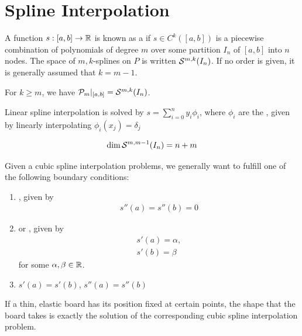 \section{Spline Interpolation}
\begin{importantdefinition}{}{}
	A function $s : [a,b] \to \mathbb{R}$ is known as a  if $s \in C^k([a,b])$ is a piecewise combination of polynomials of degree $m$ over some partition $I_n$ of $[a,b]$ into $n$ nodes. The space of $m,k$-splines on $P$ is written $\mathcal{S}^{m,k}(I_n)$. If no order is given, it is generally assumed that $k = m-1$.
\end{importantdefinition}
\begin{proposition}
	For $k \geq m$, we have $\mathcal{P}_m|_{[a,b]} = \mathcal{S}^{m,k}(I_n)$.
\end{proposition}
\begin{theorem}
	Linear spline interpolation is solved by $s = \sum_{i = 0}^n y_i \phi_i$, where $\phi_i$ are the , given by linearly interpolating $\phi_i(x_j) = \delta_j$
\end{theorem}
\begin{theorem}
	\begin{align*}
		\dim \mathcal{S}^{m,m-1}(I_n) = n + m
	\end{align*}
\end{theorem}
\begin{definition}
	Given a cubic spline interpolation problems, we generally want to fulfill one of the following boundary conditions:
	\begin{enumerate}
		\item {}, given by
		\begin{align*}
			s''(a) = s''(b) = 0
		\end{align*}
		\item {} or , given by
		\begin{align*}
			s'(a) = \alpha,\\
			s'(b) = \beta
		\end{align*}
		for some $\alpha, \beta \in \mathbb{R}$.
		\item {} $s'(a) = s'(b)$, $s''(a) = s''(b)$
	\end{enumerate}
\end{definition}
If a thin, elastic board has its position fixed at certain points, the shape that the board takes is exactly the solution of the corresponding cubic spline interpolation problem.
